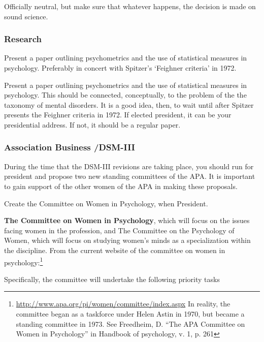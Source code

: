 \begin{refsection}
Officially neutral, but make sure that whatever happens, the decision is made on sound science.

\subsubsection{Research}
\label{research}

\begin{writingtask}[Anastasi]\label{writingtask:anastasi}
Present a paper outlining psychometrics and the use of statistical measures in psychology. Preferably in concert with Spitzer’s ‘Feighner criteria’ in 1972.
\end{writingtask}

Present a paper outlining psychometrics and the use of statistical measures in psychology. This should be connected, conceptually, to the problem of the the taxonomy of mental disorders. It is a good idea, then, to wait until after Spitzer presents the Feighner criteria in 1972. If elected president, it can be your presidential address. If not, it should be a regular paper.

\subsubsection{Association Business \slash  DSM-III}
\label{associationbusinessdsm-iii}

During the time that the DSM-III revisions are taking place, you should run for president and propose two new standing committees of the APA. It is important to gain support of the other women of the APA in making these proposals.\begin{proposal}[Anastasi]\label{proposal:anastasiA}
Create the Committee on Women in Psychology, when President.
\end{proposal}

\textbf{The Committee on Women in Psychology}, which will focus on the issues facing women in the profession, and The Committee on the Psychology of Women, which will focus on studying women's minds as a specialization within the discipline. From the current website of the committee on women in psychology:\footnote{\url{http://www.apa.org/pi/women/committee/index.aspx} In reality, the committee began as a taskforce under Helen Astin in 1970, but became a standing committee in 1973. See Freedheim, D. “The APA Committee on Women in Psychology” in Handbook of psychology, v. 1, p. 261}

Specifically, the committee will undertake the following priority tasks


\end{refsection}
